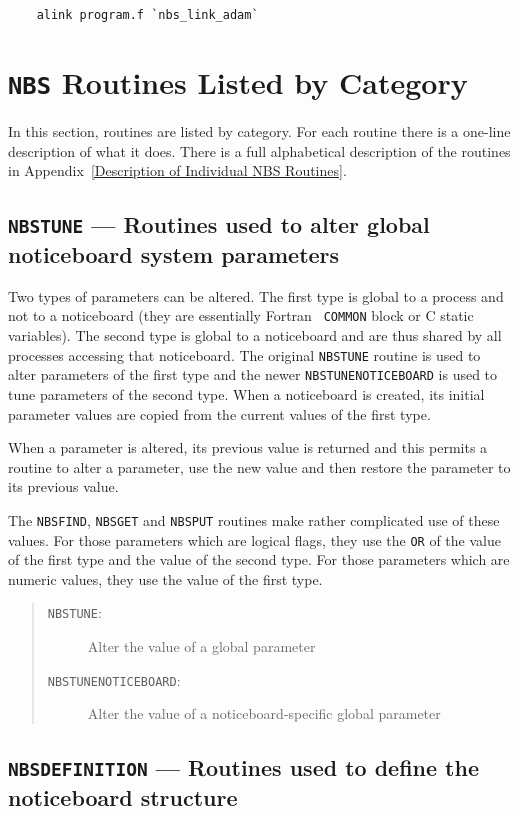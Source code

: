 \documentclass[twoside,11pt]{article}
\renewcommand{\_}{\texttt{\symbol{95}}}
\newcommand{\mansection}[2]{\subsection{#1 --- #2}}
\newenvironment{mansectionroutines}{\begin{quote}\begin{description}}%
{\end{description}\end{quote}}
\newcommand{\mansectionitem}[1]{\item[#1:]\mbox{}}
\newcommand{\mantt}{\tt}
\begin{document}
\begin {verbatim}
    alink program.f `nbs_link_adam`
\end{verbatim}

\newpage
\section {{\tt NBS} Routines Listed by Category}

In this section, routines are listed by category. For each routine there
is a one-line description of what it does. There is a full alphabetical
description of the routines in Appendix~\ref {Description of Individual
NBS Routines}.

\mansection {{\mantt{NBS\_TUNE}}}{      Routines used to alter global %
noticeboard system parameters}

      Two types of parameters can be altered. The first type is global to a
      process and not to a noticeboard (they are essentially Fortran {\mantt{%
COMMON}}
      block or C static variables). The second type is global to a noticeboard
      and are thus shared by all processes accessing that noticeboard. The
      original {\mantt{NBS\_TUNE}} routine is used to alter parameters of the %
first type
      and the newer {\mantt{NBS\_TUNE\_NOTICEBOARD}} is used to tune %
parameters of the
      second type. When a noticeboard is created, its initial parameter values
      are copied from the current values of the first type.

      When a parameter is altered, its previous value is returned and this
      permits a routine to alter a parameter, use the new value and then
      restore the parameter to its previous value.

      The {\mantt{NBS\_FIND}}, {\mantt{NBS\_GET}} and {\mantt{NBS\_PUT}} %
routines make rather complicated use of
      these values. For those parameters which are logical flags, they use
      the {\mantt{OR}} of the value of the first type and the value of the %
second type.
      For those parameters which are numeric values, they use the value of the
      first type.

\begin{mansectionroutines}
\mansectionitem {{\mantt{NBS\_TUNE}}}
      Alter the value of a global parameter
\mansectionitem {{\mantt{NBS\_TUNE\_NOTICEBOARD}}}
      Alter the value of a noticeboard-specific global parameter
\end{mansectionroutines}
\mansection {{\mantt{NBS\_DEFINITION}}}{      Routines used to define the %
noticeboard structure}
\end{document}

